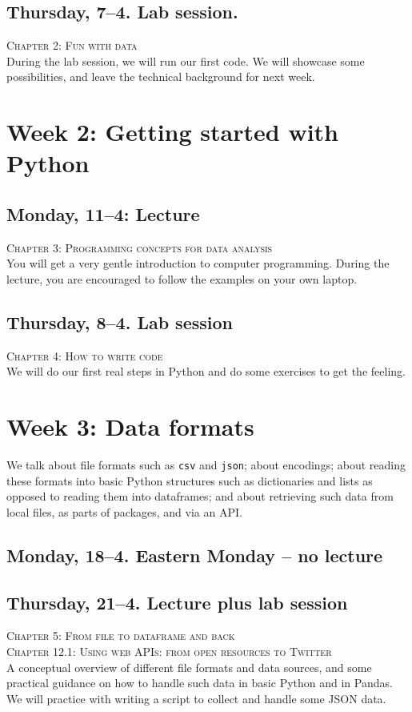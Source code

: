 \subsection*{Thursday, 7--4. Lab session.}
\textsc{ Chapter 2: Fun with data}\\

During the lab session, we will run our first code. We will showcase some possibilities, and leave the technical background for next week.


\section*{Week 2: Getting started with Python  }

\subsection*{Monday, 11--4: Lecture}
\textsc{ Chapter 3: Programming concepts for data analysis}\\
You will get a very gentle introduction to computer programming. During the lecture, you are encouraged to follow the examples on your own laptop.

\subsection*{Thursday, 8--4. Lab session}
\textsc{ Chapter 4: How to write code}\\
We will do our first real steps in Python and do some exercises to get the feeling.\\ 


\section*{Week 3:  Data formats}

We talk about file formats such as \texttt{csv} and \texttt{json}; about encodings; about reading these formats into basic Python structures such as dictionaries and lists as opposed to reading them into dataframes; and about retrieving such data from local files, as parts of packages, and via an API.

\subsection*{Monday, 18--4. Eastern Monday -- no lecture}

\subsection*{Thursday, 21--4. Lecture plus lab session}
\textsc{ Chapter 5: From file to dataframe and back}\\
\textsc{ Chapter 12.1: Using web APIs: from open resources to Twitter}\\
A conceptual overview of different file formats and data sources, and some practical guidance on how to handle such data in basic Python and in Pandas. We will practice with writing a script to collect and handle some JSON data.


